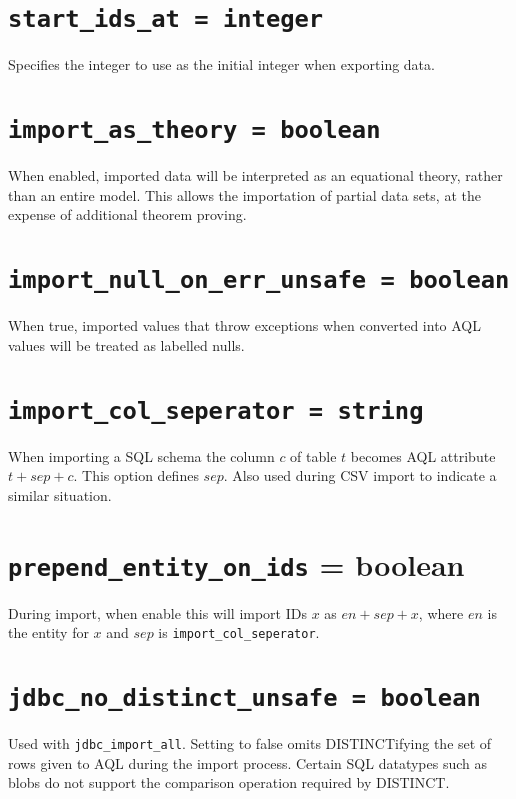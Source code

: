 \documentclass[10pt]{book}
\begin{document}
\section{ {\tt start\_ids\_at = integer}}

Specifies the integer to use as the initial integer when exporting data.

\section{ {\tt import\_as\_theory = boolean}}

When enabled, imported data will be interpreted as an equational theory, rather than an entire model.  This allows the importation of partial data sets, at the expense of additional theorem proving.

\section{ {\tt import\_null\_on\_err\_unsafe = boolean} }

When true, imported values that throw exceptions when converted into AQL values will be treated as labelled nulls.
			
\section{ {\tt import\_col\_seperator = string} }

When importing a SQL schema the column $c$ of table $t$ becomes AQL attribute $t + sep + c$.  This option defines $sep$.  Also used during CSV import to indicate a similar situation.

\section{ {\tt prepend\_entity\_on\_ids} = boolean }

During import, when enable this will import IDs $x$ as $en + sep + x$, where $en$ is the entity for $x$ and $sep$ is  {\tt import\_col\_seperator}. 

\section{ {\tt jdbc\_no\_distinct\_unsafe = boolean} }

Used with {\tt jdbc\_import\_all}.  Setting to false omits DISTINCTifying the set of rows given to AQL during the import process.  Certain SQL datatypes such as blobs do not support the comparison operation required by DISTINCT.
\end{document}
